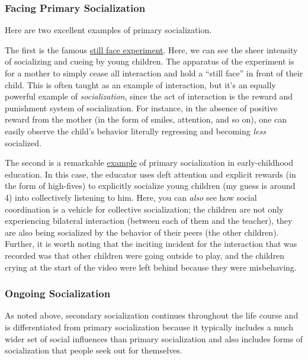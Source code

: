 \documentclass[
  letterpaper,
  DIV=11,
  numbers=noendperiod,
  oneside]{scrartcl}
\begin{document}
\subsubsection{Facing Primary
Socialization}\label{facing-primary-socialization}

Here are two excellent examples of primary socialization.

The first is the famous
\href{https://www.youtube.com/watch?v=f1Jw0-LExyc}{still face
experiment}. Here, we can see the sheer intensity of socializing and
cueing by young children. The apparatus of the experiment is for a
mother to simply cease all interaction and hold a ``still face'' in
front of their child. This is often taught as an example of interaction,
but it's an equally powerful example of \emph{socialization}, since the
act of interaction is the reward and punishment system of socialization.
For instance, in the absence of positive reward from the mother (in the
form of smiles, attention, and so on), one can easily observe the
child's behavior literally regressing and becoming \emph{less}
socialized.

The second is a remarkable
\href{https://www.tiktok.com/@brandz100/video/7345831569459825950}{example}
of primary socialization in early-childhood education. In this case, the
educator uses deft attention and explicit rewards (in the form of
high-fives) to explicitly socialize young children (my guess is around
4) into collectively listening to him. Here, you can \emph{also} see how
social coordination is a vehicle for collective socialization; the
children are not only experiencing bilateral interaction (between each
of them and the teacher), they are also being socialized by the behavior
of their peers (the other children). Further, it is worth noting that
the inciting incident for the interaction that was recorded was that
other children were going outside to play, and the children crying at
the start of the video were left behind because they were misbehaving.

\subsubsection{Ongoing Socialization}\label{ongoing-socialization}

As noted above, secondary socialization continues throughout the life
course and is differentiated from primary socialization because it
typically includes a much wider set of social influences than primary
socialization and also includes forms of socialization that people seek
out for themselves.
\end{document}
